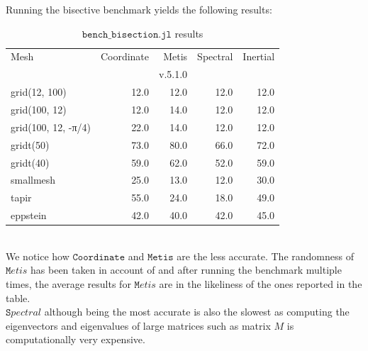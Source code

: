 \documentclass[unicode,11pt,a4paper,oneside,numbers=endperiod,openany]{scrartcl}
\begin{document}
\clearpage
Running the bisective benchmark yields the following results:
\begin{table}[h!]
\caption{$\texttt {bench\_bisection.jl}$ results}
\centering
\begin{tabular}{l|r|r|r|r} \hline\hline 
                Mesh &  Coordinate &    Metis &  Spectral &  Inertial \\
                     &             &  v.5.1.0 &           &          \\
\hline grid(12, 100) &        12.0 &     12.0 &      12.0 &      12.0 \\
       grid(100, 12) &        12.0 &     14.0 &      12.0 &      12.0 \\
 grid(100, 12, -π/4) &        22.0 &     14.0 &      12.0 &      12.0 \\
           gridt(50) &        73.0 &     80.0 &      66.0 &      72.0 \\
           gridt(40) &        59.0 &     62.0 &      52.0 &      59.0 \\
           smallmesh &        25.0 &     13.0 &      12.0 &      30.0 \\
               tapir &        55.0 &     24.0 &      18.0 &      49.0 \\
            eppstein &        42.0 &     40.0 &      42.0 &      45.0 \\
\hline \hline
\end{tabular}
\label{table:bisection}
\end{table}\\
We notice how $\texttt {Coordinate}$ and $\texttt{Metis}$ are the less accurate. The randomness of $\texttt Metis$ has been taken in account of and after running the benchmark multiple times, the average results for $\texttt Metis$ are in the likeliness of the ones reported in the table.\\
$\texttt Spectral$ although being the most accurate is also the slowest as computing the eigenvectors and eigenvalues of large matrices such as matrix $M$ is computationally very expensive.
\end{document}
